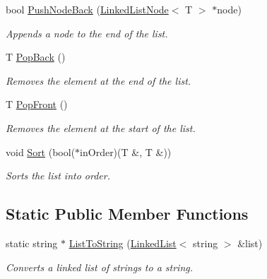 \begin{DoxyCompactItemize}
bool \hyperlink{classutil_1_1LinkedList_afac5b9fc8305e19fa4ebdeb8a2d74e1c}{Push\+Node\+Back} (\hyperlink{classutil_1_1LinkedListNode}{Linked\+List\+Node}$<$ T $>$ $\ast$node)
\begin{DoxyCompactList}\small\item\em Appends a node to the end of the list. \end{DoxyCompactList}\item 
T \hyperlink{classutil_1_1LinkedList_ac7f5e9d19d9886b6b0b22232fc001424}{Pop\+Back} ()
\begin{DoxyCompactList}\small\item\em Removes the element at the end of the list. \end{DoxyCompactList}\item 
T \hyperlink{classutil_1_1LinkedList_a07c6ba47539024e050d1fb4d2498632e}{Pop\+Front} ()
\begin{DoxyCompactList}\small\item\em Removes the element at the start of the list. \end{DoxyCompactList}\item 
void \hyperlink{classutil_1_1LinkedList_ab77a211e4961b76e7b68b5d3ff1cd7ee}{Sort} (bool($\ast$in\+Order)(T \&, T \&))
\begin{DoxyCompactList}\small\item\em Sorts the list into order. \end{DoxyCompactList}\end{DoxyCompactItemize}
\subsection*{Static Public Member Functions}
\begin{DoxyCompactItemize}
\item 
static string $\ast$ \hyperlink{classutil_1_1LinkedList_a712945761054fdafd091b40bb5772003}{List\+To\+String} (\hyperlink{classutil_1_1LinkedList}{Linked\+List}$<$ string $>$ \&list)
\begin{DoxyCompactList}\small\item\em Converts a linked list of strings to a string. \end{DoxyCompactList}\end{DoxyCompactItemize}
